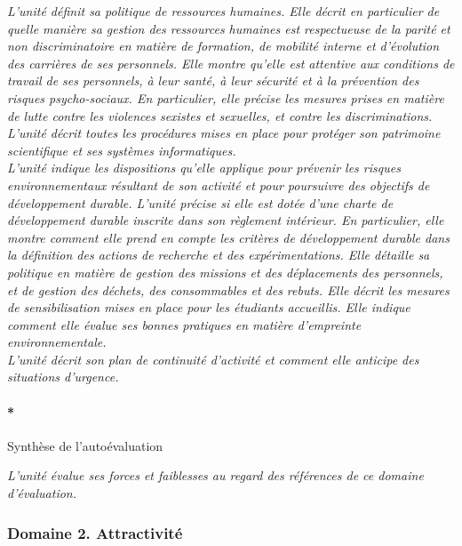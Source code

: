 \documentclass[]{article}
\let\oldparagraph\paragraph
\renewcommand{\paragraph}[1]{\oldparagraph{#1}\mbox{}}
\newcommand{\instructions}[1]{{\em \color{hceresgreen}#1}}
\begin{document}
\instructions{L’unité définit sa politique de ressources humaines. Elle décrit en particulier de quelle manière sa gestion des ressources humaines est respectueuse de la parité et non discriminatoire en matière de formation, de mobilité interne et d’évolution des carrières de ses personnels. Elle montre qu’elle est attentive aux conditions de travail de ses personnels, à leur santé, à leur sécurité et à la prévention des risques psycho-sociaux. En particulier, elle précise les mesures prises en matière de lutte contre les violences sexistes et sexuelles, et contre les discriminations.\\

L'unité décrit toutes les procédures mises en place pour protéger son patrimoine scientifique et ses systèmes informatiques.\\

L’unité indique les dispositions qu’elle applique pour prévenir les risques environnementaux résultant de son activité et pour poursuivre des objectifs de développement durable. L’unité précise si elle est dotée d’une charte de développement durable inscrite dans son règlement intérieur. En particulier, elle montre comment elle prend en compte les critères de développement durable dans la définition des actions de recherche et des expérimentations. Elle détaille sa politique en matière de gestion des missions et des déplacements des personnels, et de gestion des déchets, des consommables et des rebuts. Elle décrit les mesures de sensibilisation mises en place pour les étudiants accueillis. Elle indique comment elle évalue ses bonnes pratiques en matière d’empreinte environnementale.\\

L’unité décrit son plan de continuité d'activité et comment elle anticipe des situations d'urgence.}

\paragraph*{Synthèse de l'autoévaluation}

\instructions{L’unité évalue ses forces et faiblesses au regard des références de ce domaine d’évaluation.}

\subsubsection*{Domaine 2. Attractivité}
\end{document}
